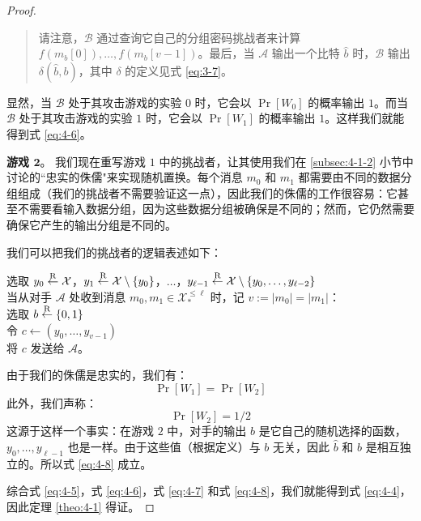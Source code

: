 \begin{proof}
\begin{quote}
\vspace*{5pt}

请注意，$\mathcal{B}$ 通过查询它自己的分组密码挑战者来计算 $f(m_b[0]),\dots,f(m_b[v-1])$。最后，当 $\mathcal{A}$ 输出一个比特 $\hat b$ 时，$\mathcal{B}$ 输出 $\delta(\hat b,b)$，其中 $\delta$ 的定义见式 \ref{eq:3-7}。
\end{quote}
显然，当 $\mathcal{B}$ 处于其攻击游戏的实验 $0$ 时，它会以 $\Pr[W_0]$ 的概率输出 $1$。而当 $\mathcal{B}$ 处于其攻击游戏的实验 $1$ 时，它会以 $\Pr[W_1]$ 的概率输出 $1$。这样我们就能得到式 \ref{eq:4-6}。

\vspace{8pt}

\noindent
\textbf{游戏 $\mathbf{2}$}。
我们现在重写游戏 $1$ 中的挑战者，让其使用我们在 \ref{subsec:4-1-2} 小节中讨论的``忠实的侏儒"来实现随机置换。每个消息 $m_0$ 和 $m_1$ 都需要由不同的数据分组组成（我们的挑战者不需要验证这一点），因此我们的侏儒的工作很容易：它甚至不需要看输入数据分组，因为这些数据分组被确保是不同的；然而，它仍然需要确保它产生的输出分组是不同的。

我们可以把我们的挑战者的逻辑表述如下：

\vspace*{5pt}

\hspace*{5pt} 选取 $y_0\overset{\rm R}\leftarrow\mathcal{X}$，$y_1\overset{\rm R}\leftarrow\mathcal{X}\setminus\{y_0\}$，$\dots$，$y_{\ell-1}\overset{\rm R}\leftarrow\mathcal{X}\setminus\{y_0,\dots,y_{\ell-2}\}$\\
\hspace*{26pt} 当从对手 $\mathcal{A}$ 处收到消息 $m_0,m_1\in\mathcal{X}_*^{\leq\ell}$ 时，记 $v:=|m_0|=|m_1|$：\\
\hspace*{50pt} 选取 $b\overset{\rm R}\leftarrow\{0,1\}$\\
\hspace*{50pt} 令 $c\leftarrow(y_0,\dots,y_{v-1})$\\
\hspace*{50pt} 将 $c$ 发送给 $\mathcal{A}$。

\vspace*{5pt}

由于我们的侏儒是忠实的，我们有：
\begin{equation}\label{eq:4-7}
\Pr[W_1]=\Pr[W_2]
\end{equation}
此外，我们声称：
\begin{equation}\label{eq:4-8}
\Pr[W_2]={1}/{2}
\end{equation}
这源于这样一个事实：在游戏 $2$ 中，对手的输出 $\hat b$ 是它自己的随机选择的函数，$y_0,\dots,y_{\ell-1}$ 也是一样。由于这些值（根据定义）与 $b$ 无关，因此 $\hat b$ 和 $b$ 是相互独立的。所以式 \ref{eq:4-8} 成立。

综合式 \ref{eq:4-5}，式 \ref{eq:4-6}，式 \ref{eq:4-7} 和式 \ref{eq:4-8}，我们就能得到式 \ref{eq:4-4}，因此定理 \ref{theo:4-1} 得证。
\end{proof}

